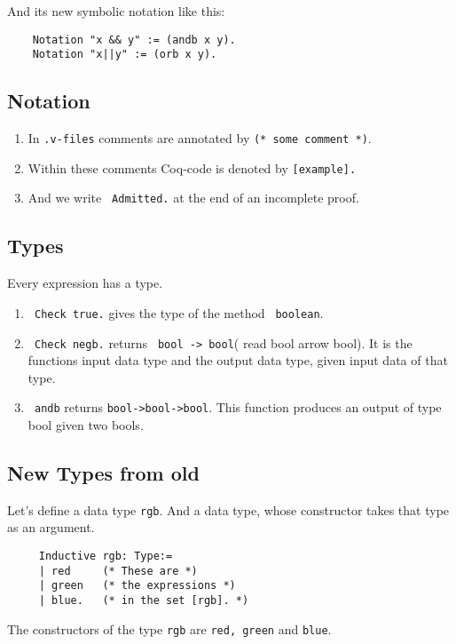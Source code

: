     And its new symbolic notation like this:
    \begin{lstlisting}
    Notation "x && y" := (andb x y).
    Notation "x||y" := (orb x y).
    \end{lstlisting}
    
     
\subsection{Notation}
     
    \begin{enumerate}
     \item In \texttt{.v-files} comments are annotated by \lstinline!(* some comment *)!. 
     \item Within these comments Coq-code is denoted by \lstinline![example].! 
     \item And we write \lstinline! Admitted.! at the end of an incomplete proof.    
     \end{enumerate}
     
     
\subsection{Types}

     Every expression has a type.
     \begin{enumerate}
     \item  \lstinline! Check true.! gives the type of the method \lstinline! boolean!.
     \item \lstinline! Check negb.! returns \lstinline! bool -> bool!( read \glqq bool arrow bool\grqq).
      It is the functions input data type and the output data type, given input data of that type.
      \item \lstinline! andb! returns \lstinline!bool->bool->bool!. This function produces an output of type bool given two bools.
     \end{enumerate}
     
\subsection{New Types from old}

	 Let's define a data type \lstinline!rgb!. And a data type, whose constructor takes that type as an argument.
	\begin{lstlisting}
	 Inductive rgb: Type:=
	 | red     (* These are *)
	 | green   (* the expressions *)
	 | blue.   (* in the set [rgb]. *)
	 \end{lstlisting}
	 The constructors of the type \lstinline!rgb! are  \lstinline!red, green! and \lstinline!blue!. 
	 
